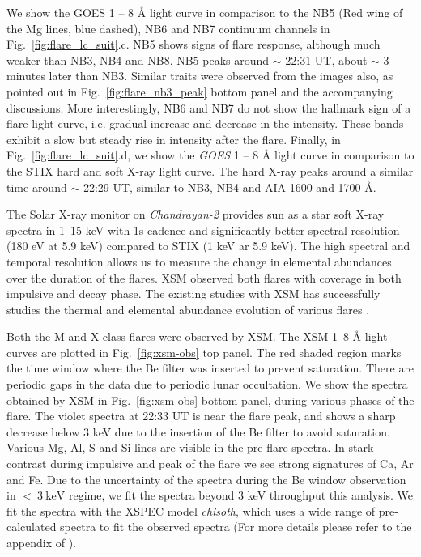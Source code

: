 \documentclass[12pt]{article}
\begin{document}
We show the GOES 1 {--} 8 {\AA} light curve in comparison to the NB5 (Red wing of the Mg lines, blue dashed), NB6 and NB7 continuum channels in Fig.~\ref{fig:flare_lc_suit}.c. NB5 shows signs of flare response, although much weaker than NB3, NB4 and NB8. NB5 peaks around $\sim$ 22:31 UT, about $\sim$ 3 minutes later than NB3. Similar traits were observed from the images also, as pointed out in Fig.~\ref{fig:flare_nb3_peak} bottom panel and the accompanying discussions. More interestingly, NB6 and NB7 do not show the hallmark sign of a flare light curve, i.e. gradual increase and decrease in the intensity. These bands exhibit a slow but steady rise in intensity after the flare. Finally, in Fig.~\ref{fig:flare_lc_suit}.d, we show the {\it GOES} 1 {--} 8 {\AA} light curve in comparison to the STIX hard and soft X-ray light curve. The hard X-ray peaks around a similar time around $\sim$ 22:29 UT, similar to NB3, NB4 and AIA 1600 and 1700 {\AA}.

The Solar X-ray monitor on {\it Chandrayan-2}\citep[{\it Chandrayan-2}/XSM,][]{xsm} provides sun as a star soft X-ray spectra in 1{--}15 keV with 1s cadence and significantly better spectral resolution (180 eV at 5.9 keV) compared to STIX (1 keV ar 5.9 keV). The high spectral and temporal resolution allows us to measure the change in elemental abundances over the duration of the flares. XSM observed both flares with coverage in both impulsive and decay phase. The existing studies with XSM has successfully studies the thermal and elemental abundance evolution of various flares \citep{mondal21,kkepa23,nama23}.

Both the M and X-class flares were observed by XSM. The XSM 1{--}8 {\AA} light curves are plotted in Fig.~\ref{fig:xsm-obs} top panel. The red shaded region marks the time window where the Be filter was inserted to prevent saturation. There are periodic gaps in the data due to periodic lunar occultation. We show the spectra obtained by XSM in Fig.~\ref{fig:xsm-obs} bottom panel, during various phases of the flare. The violet spectra at 22:33 UT is near the flare peak, and shows a sharp decrease below 3 keV due to the insertion of the Be filter to avoid saturation. Various Mg, Al, S and Si lines are visible in the pre-flare spectra. In stark contrast during impulsive and peak of the flare we see strong signatures of Ca, Ar and Fe. Due to the uncertainty of the spectra during the Be window observation in $<~3~\mathrm{keV}$ regime, we fit the spectra beyond 3 keV throughput this analysis. We fit the spectra with the XSPEC model {\it chisoth}, which uses a wide range of pre-calculated spectra to fit the observed spectra (For more details please refer to the appendix of \cite{mondal21}).
\end{document}

